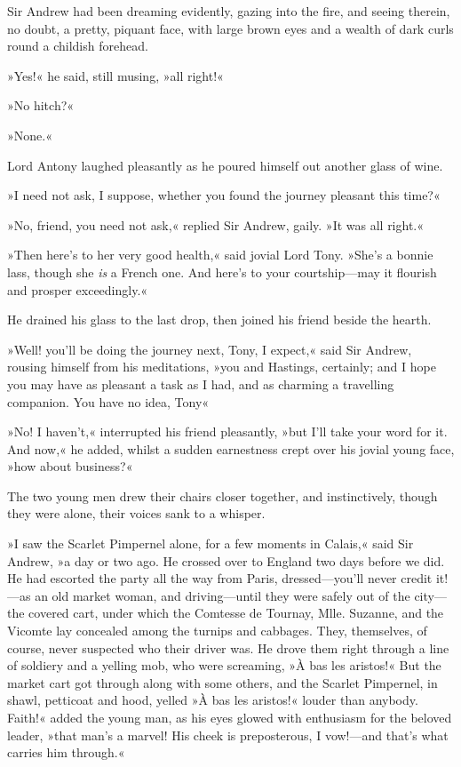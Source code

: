 Sir Andrew had been dreaming evidently, gazing into the fire, and seeing therein, no doubt, a pretty, piquant face, with large brown eyes and a wealth of dark curls round a childish forehead.

»Yes!« he said, still musing, »all right!«

»No hitch?«

»None.«

Lord Antony laughed pleasantly as he poured himself out another glass of wine.

»I need not ask, I suppose, whether you found the journey pleasant this time?«

»No, friend, you need not ask,« replied Sir Andrew, gaily. »It was all right.«

»Then here's to her very good health,« said jovial Lord Tony. »She's a bonnie lass, though she \textit{is} a French one. And here's to your courtship—may it flourish and prosper exceedingly.«

He drained his glass to the last drop, then joined his friend beside the hearth.

»Well! you'll be doing the journey next, Tony, I expect,« said Sir Andrew, rousing himself from his meditations, »you and Hastings, certainly; and I hope you may have as pleasant a task as I had, and as charming a travelling companion. You have no idea, Tony\textellipsis«

»No! I haven't,« interrupted his friend pleasantly, »but I'll take your word for it. And now,« he added, whilst a sudden earnestness crept over his jovial young face, »how about business?«

The two young men drew their chairs closer together, and instinctively, though they were alone, their voices sank to a whisper.

»I saw the Scarlet Pimpernel alone, for a few moments in Calais,« said Sir Andrew, »a day or two ago. He crossed over to England two days before we did. He had escorted the party all the way from Paris, dressed—you'll never credit it!—as an old market woman, and driving—until they were safely out of the city—the covered cart, under which the Comtesse de Tournay, Mlle. Suzanne, and the Vicomte lay concealed among the turnips and cabbages. They, themselves, of course, never suspected who their driver was. He drove them right through a line of soldiery and a yelling mob, who were screaming, »À bas les aristos!« But the market cart got through along with some others, and the Scarlet Pimpernel, in shawl, petticoat and hood, yelled »À bas les aristos!« louder than anybody. Faith!« added the young man, as his eyes glowed with enthusiasm for the beloved leader, »that man's a marvel! His cheek is preposterous, I vow!—and that's what carries him through.«

